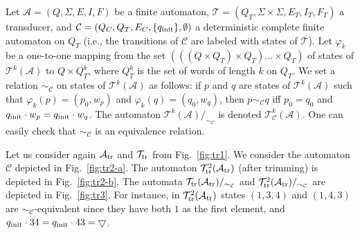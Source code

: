 \documentclass[]{llncs}
\def \A {\mathcal{A}}
\def \T {\mathcal{T}}
\def \C {\mathcal{C}}
\begin{document}
Let $\A=(Q,\Sigma,E,I,F)$ be a finite automaton,
$\mathcal{T}=(Q_T,\Sigma\times\Sigma,E_T,I_T,F_T)$ a transducer, and 
$\C=(Q_C,Q_T,E_C,\{q_{\rm init}\},\emptyset)$ a deterministic complete finite
automaton on $Q_T$ (i.e., the transitions of $\C$ are labeled with states of
$\mathcal{T}$).
Let $\varphi_k$ be a one-to-one mapping from the set
$(((Q\times Q_T)\times Q_T)\ldots \times Q_T)$ of states of $\T^k(\A)$ to
$Q\times Q_T^k$, where $Q_T^k$ is the set of words of length $k$ on $Q_T$. We
set a relation $\sim_\C$ on states of $\T^k(\A)$ as follows: if $p$ and $q$
are states of $\T^k(\A)$ such that $\varphi_k(p)=(p_0,w_p)$ and
$\varphi_k(q)=(q_0,w_q)$, then $p\sim_\C q$ iff $p_0=q_0$ and $q_{\rm
  init}\cdot w_p=q_{\rm init}\cdot w_q$. The automaton $\T^k(\A)/_{\sim_\C}$
is denoted $\T^k_\C(\A).$ One can easily check that $\sim_\C$ is an
equivalence relation.

Let us consider again $\A_{\rm tr}$ and $\mathcal{T}_{\rm tr}$ from
Fig.~\ref{fig:tr1}. We consider the automaton $\C$ depicted in
Fig.~\ref{fig:tr2-a}. The automaton $\mathcal{T}_{\rm tr}^2(\A_{\rm
  tr})$ (after trimming) is depicted in Fig.~\ref{fig:tr2-b}. The
automata $\mathcal{T}_{\rm tr}(\A_{\rm tr})/_{\sim_\C}$ and
$\mathcal{T}_{\rm tr}^2(\A_{\rm tr})/_{\sim_\C}$ are depicted in
Fig.~\ref{fig:tr3}. For instance, in $\mathcal{T}_{\rm tr}^2(\A_{\rm
  tr})$ states $(1,3,4)$ and $(1,4,3)$ are $\sim_\C$-equivalent since
they have both $1$ as the first element, and $q_{\rm init}\cdot 34=q_{\rm
  init}\cdot 43=\bigtriangledown$.
\end{document}
